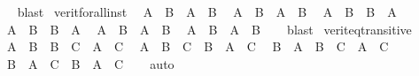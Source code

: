 \begin{isabellebody}
%
\isadelimproof
\ \ %
\endisadelimproof
%
\isatagproof
{}\isamarkupfalse%
\ blast{\isacharplus}{\kern0pt}%
\endisatagproof
{\isafoldproof}%
%
\isadelimproof
\isanewline
%
\endisadelimproof
\isanewline
{}\isamarkupfalse%
\ verit{\isacharunderscore}{\kern0pt}forall{\isacharunderscore}{\kern0pt}inst{\isacharcolon}{\kern0pt}\isanewline
\ \ {\isacartoucheopen}A\ {\isasymlongleftrightarrow}\ B\ {\isasymLongrightarrow}\ {\isasymnot}A\ {\isasymor}\ B{\isacartoucheclose}\isanewline
\ \ {\isacartoucheopen}{\isasymnot}A\ {\isasymlongleftrightarrow}\ B\ {\isasymLongrightarrow}\ A\ {\isasymor}\ B{\isacartoucheclose}\isanewline
\ \ {\isacartoucheopen}A\ {\isasymlongleftrightarrow}\ B\ {\isasymLongrightarrow}\ {\isasymnot}B\ {\isasymor}\ A{\isacartoucheclose}\isanewline
\ \ {\isacartoucheopen}A\ {\isasymlongleftrightarrow}\ {\isasymnot}B\ {\isasymLongrightarrow}\ B\ {\isasymor}\ A{\isacartoucheclose}\isanewline
\ \ {\isacartoucheopen}A\ {\isasymlongrightarrow}\ B\ {\isasymLongrightarrow}\ {\isasymnot}A\ {\isasymor}\ B{\isacartoucheclose}\isanewline
\ \ {\isacartoucheopen}{\isasymnot}A\ {\isasymlongrightarrow}\ B\ {\isasymLongrightarrow}\ A\ {\isasymor}\ B{\isacartoucheclose}\isanewline
%
\isadelimproof
\ \ %
\endisadelimproof
%
\isatagproof
{}\isamarkupfalse%
\ blast{\isacharplus}{\kern0pt}%
\endisatagproof
{\isafoldproof}%
%
\isadelimproof
\isanewline
%
\endisadelimproof
\isanewline
{}\isamarkupfalse%
\ verit{\isacharunderscore}{\kern0pt}eq{\isacharunderscore}{\kern0pt}transitive{\isacharcolon}{\kern0pt}\isanewline
\ \ {\isacartoucheopen}A\ {\isacharequal}{\kern0pt}\ B\ {\isasymLongrightarrow}\ B\ {\isacharequal}{\kern0pt}\ C\ {\isasymLongrightarrow}\ A\ {\isacharequal}{\kern0pt}\ C{\isacartoucheclose}\isanewline
\ \ {\isacartoucheopen}A\ {\isacharequal}{\kern0pt}\ B\ {\isasymLongrightarrow}\ C\ {\isacharequal}{\kern0pt}\ B\ {\isasymLongrightarrow}\ A\ {\isacharequal}{\kern0pt}\ C{\isacartoucheclose}\isanewline
\ \ {\isacartoucheopen}B\ {\isacharequal}{\kern0pt}\ A\ {\isasymLongrightarrow}\ B\ {\isacharequal}{\kern0pt}\ C\ {\isasymLongrightarrow}\ A\ {\isacharequal}{\kern0pt}\ C{\isacartoucheclose}\isanewline
\ \ {\isacartoucheopen}B\ {\isacharequal}{\kern0pt}\ A\ {\isasymLongrightarrow}\ C\ {\isacharequal}{\kern0pt}\ B\ {\isasymLongrightarrow}\ A\ {\isacharequal}{\kern0pt}\ C{\isacartoucheclose}\isanewline
%
\isadelimproof
\ \ %
\endisadelimproof
%
\isatagproof
{}\isamarkupfalse%
\ auto%
\endisatagproof
{\isafoldproof}%
%
\isadelimproof
\isanewline
%
\endisadelimproof
\isanewline
{}\isamarkupfalse%

\end{isabellebody}
